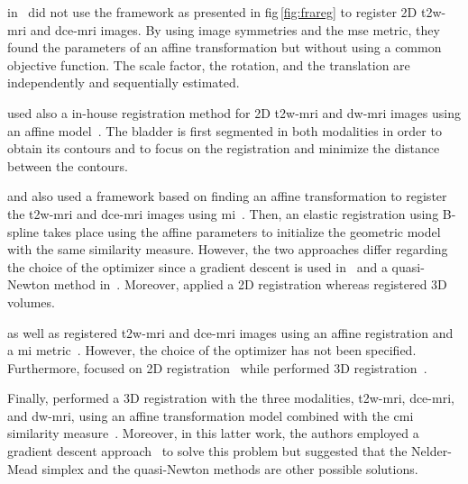 \citeauthor{Ampeliotis2008} in~\cite{Ampeliotis2007,Ampeliotis2008} did not use the framework as presented in \acs{fig}\,\ref{fig:frareg} to register 2D \ac{t2w}-\ac{mri} and \ac{dce}-\ac{mri} images.
By using image symmetries and the \ac{mse} metric, they found the parameters of an affine transformation but without using a common objective function.
The scale factor, the rotation, and the translation are independently and sequentially estimated.

\cite{Giannini2013} used also a in-house registration method for 2D \ac{t2w}-\ac{mri} and \ac{dw}-\ac{mri} images using an affine model~\cite{Giannini2013,giannini2015fully}.
The bladder is first segmented in both modalities in order to obtain its contours and to focus on the registration and minimize the distance between the contours.

\citeauthor{Giannini2013} and also \citeauthor{Vos2010} used a framework based on finding an affine transformation to register the \ac{t2w}-\ac{mri} and \ac{dce}-\ac{mri} images using \ac{mi}~\cite{Rueckert1999,Giannini2013,Vos2010}.
Then, an elastic registration using B-spline takes place using the affine parameters to initialize the geometric model with the same similarity measure.
However, the two approaches differ regarding the choice of the optimizer since a gradient descent is used in~\cite{Giannini2013} and a quasi-Newton method in~\cite{Vos2010}.
Moreover, \citeauthor{Giannini2013} applied a 2D registration whereas \citeauthor{Vos2010} registered 3D volumes.

\citeauthor{Viswanath2008a} as well as \citeauthor{Vos2008} registered \ac{t2w}-\ac{mri} and \ac{dce}-\ac{mri} images using an affine registration and a \ac{mi} metric~\cite{Viswanath2008a,Viswanath2009,Vos2008}.
However, the choice of the optimizer has not been specified. 
Furthermore, \citeauthor{Viswanath2008a} focused on 2D registration~\cite{Viswanath2008a,Viswanath2009} while \citeauthor{Vos2008} performed 3D registration~\cite{Vos2008}.

Finally, \citeauthor{Viswanath2011} performed a 3D registration with the three modalities, \ac{t2w}-\ac{mri}, \ac{dce}-\ac{mri}, and \ac{dw}-\ac{mri}, using an affine transformation model combined with the \ac{cmi} similarity measure~\cite{Viswanath2011}.
Moreover, in this latter work, the authors employed a gradient descent approach~\cite{Chappelow2011} to solve this problem but suggested that the Nelder-Mead simplex and the quasi-Newton methods are other possible solutions.

